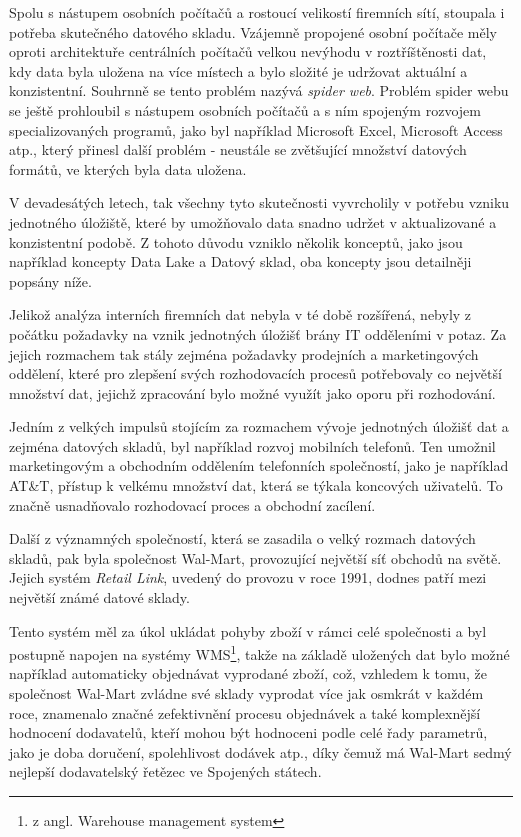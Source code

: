 \documentclass[
  digital,     %
  twoside,     %
  lof,         %
  lot,         %
]{fithesis4}
\begin{document}
Spolu s nástupem osobních počítačů a rostoucí velikostí firemních sítí, stoupala i potřeba skutečného datového skladu. Vzájemně propojené osobní počítače měly oproti architektuře centrálních počítačů velkou nevýhodu v roztříštěnosti dat, kdy data byla uložena na více místech a bylo složité je udržovat aktuální a konzistentní. Souhrnně se tento problém nazývá \emph{spider web}. \parencite[s.~6]{Inmon2005} Problém spider webu se ještě prohloubil s nástupem osobních počítačů a s ním spojeným rozvojem specializovaných programů, jako byl například Microsoft Excel, Microsoft Access atp., který přinesl další problém - neustále se zvětšující množství datových formátů, ve kterých byla data uložena.\parencite{Foote19042018}

V devadesátých letech, tak všechny tyto skutečnosti vyvrcholily v potřebu vzniku jednotného úložiště, které by umožňovalo data snadno udržet v aktualizované a konzistentní podobě. Z tohoto důvodu vzniklo několik konceptů, jako jsou například koncepty Data Lake a Datový sklad, oba koncepty jsou detailněji popsány níže.

Jelikož analýza interních firemních dat nebyla v té době rozšířená, nebyly z počátku požadavky na vznik jednotných úložišť brány IT odděleními v potaz. Za jejich rozmachem tak stály zejména požadavky prodejních a marketingových oddělení, které pro zlepšení svých rozhodovacích procesů potřebovaly co největší množství dat, jejichž zpracování bylo možné využít jako oporu při rozhodování. \parencite{Inmon2021}

Jedním z velkých impulsů stojícím za rozmachem vývoje jednotných úložišť dat a zejména datových skladů, byl například rozvoj mobilních telefonů. Ten umožnil marketingovým a obchodním oddělením telefonních společností, jako je například AT\&T, přístup k velkému množství dat, která se týkala koncových uživatelů. To značně usnadňovalo rozhodovací proces a obchodní zacílení.\parencite{Inmon2021}

Další z významných společností, která se zasadila o velký rozmach datových skladů, pak byla společnost Wal-Mart, provozující největší síť obchodů na světě. Jejich systém \emph{Retail Link}, uvedený do provozu v roce 1991, dodnes patří mezi největší známé datové sklady.\parencite{Gallaugher2018}

Tento systém měl za úkol ukládat pohyby zboží v rámci celé společnosti a byl postupně napojen na systémy WMS\footnote{z angl. Warehouse management system}, takže na základě uložených dat bylo možné například automaticky objednávat vyprodané zboží, což, vzhledem k tomu, že společnost Wal-Mart zvládne své sklady vyprodat více jak osmkrát v každém roce, znamenalo značné zefektivnění procesu objednávek a také komplexnější hodnocení dodavatelů, kteří mohou být hodnoceni podle celé řady parametrů, jako je doba doručení, spolehlivost dodávek atp., díky čemuž má Wal-Mart sedmý nejlepší dodavatelský řetězec ve Spojených státech.\parencite{Gallaugher2018}  
\end{document}
